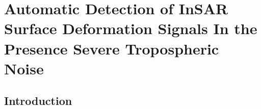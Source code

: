 
\chapter{Automatic Detection of InSAR Surface Deformation Signals In the Presence Severe Tropospheric Noise}
\label{CHAP:6-blob}


\section{Introduction}
\label{sec:ch6-intro}

